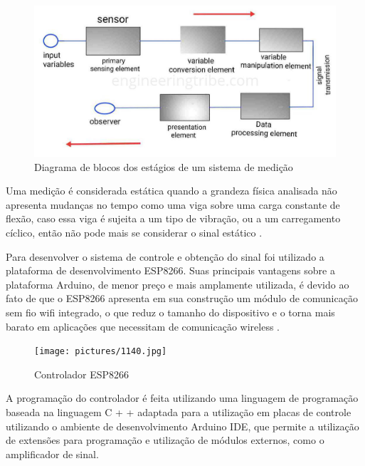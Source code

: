 \begin{figure}[htb]
	\caption{\label{fig:1130} Diagrama de blocos dos estágios de um sistema de medição}
	\begin{center}
		\includegraphics[width=\textwidth]{pictures/1130.jpg}
	\end{center}
\end{figure}

Uma medição é considerada estática quando a grandeza física analisada não apresenta mudanças no tempo como uma viga sobre uma carga constante de flexão, caso essa viga
é sujeita a um tipo de vibração, ou a um carregamento cíclico, então não pode mais se considerar o sinal estático \autocite{Hollman2011}.

Para desenvolver o sistema de controle e obtenção do sinal foi utilizado a plataforma de desenvolvimento ESP8266.
Suas principais vantagens sobre a plataforma Arduino, de menor preço e mais amplamente utilizada, é devido ao fato de que o ESP8266 apresenta em sua construção um módulo de
comunicação sem fio wifi integrado, o que reduz o tamanho do dispositivo e o torna mais barato em aplicações que necessitam de comunicação wireless \autocite{DocsESP8266}.

\begin{figure}[htb]
	\caption{\label{fig:1140} Controlador ESP8266}
	\begin{center}
		\texttt{[image: pictures/1140.jpg]}
	\end{center}
\end{figure}

A programação do controlador é feita utilizando uma linguagem de programação baseada na linguagem C + + adaptada para a utilização em placas de controle utilizando o ambiente
de desenvolvimento Arduino IDE, que permite a utilização de extensões para programação e utilização de módulos externos, como o amplificador de sinal.

